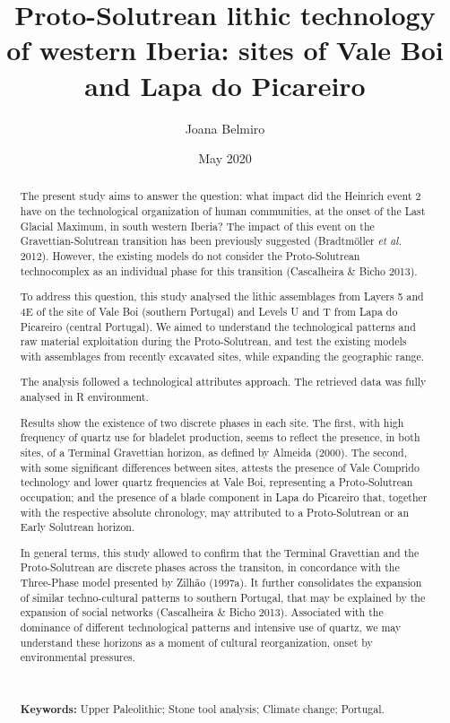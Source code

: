 \documentclass[12pt,twoside]{reedthesis}
\title{Proto-Solutrean lithic technology of western Iberia: sites of Vale Boi and Lapa do Picareiro}
\author{Joana Belmiro}
\date{May 2020}
\begin{document}
  \maketitle

\frontmatter %


  \begin{abstract}
    The present study aims to answer the question: what impact did the Heinrich event 2 have on the technological organization of human communities, at the onset of the Last Glacial Maximum, in south western Iberia? The impact of this event on the Gravettian-Solutrean transition has been previously suggested (Bradtmöller \emph{et al.} 2012). However, the existing models do not consider the Proto-Solutrean technocomplex as an individual phase for this transition (Cascalheira \& Bicho 2013).
    
    \par
    
    To address this question, this study analysed the lithic assemblages from Layers 5 and 4E of the site of Vale Boi (southern Portugal) and Levels U and T from Lapa do Picareiro (central Portugal). We aimed to understand the technological patterns and raw material exploitation during the Proto-Solutrean, and test the existing models with assemblages from recently excavated sites, while expanding the geographic range.
    
    The analysis followed a technological attributes approach. The retrieved data was fully analysed in R environment.
    
    Results show the existence of two discrete phases in each site. The first, with high frequency of quartz use for bladelet production, seems to reflect the presence, in both sites, of a Terminal Gravettian horizon, as defined by Almeida (2000). The second, with some significant differences between sites, attests the presence of Vale Comprido technology and lower quartz frequencies at Vale Boi, representing a Proto-Solutrean occupation; and the presence of a blade component in Lapa do Picareiro that, together with the respective absolute chronology, may attributed to a Proto-Solutrean or an Early Solutrean horizon.
    
    In general terms, this study allowed to confirm that the Terminal Gravettian and the Proto-Solutrean are discrete phases across the transiton, in concordance with the Three-Phase model presented by Zilhão (1997a). It further consolidates the expansion of similar techno-cultural patterns to southern Portugal, that may be explained by the expansion of social networks (Cascalheira \& Bicho 2013). Associated with the dominance of different technological patterns and intensive use of quartz, we may understand these horizons as a moment of cultural reorganization, onset by environmental pressures.
    
    ~
    
    \textbf{Keywords:} Upper Paleolithic; Stone tool analysis; Climate change; Portugal.
  \end{abstract}
\end{document}
